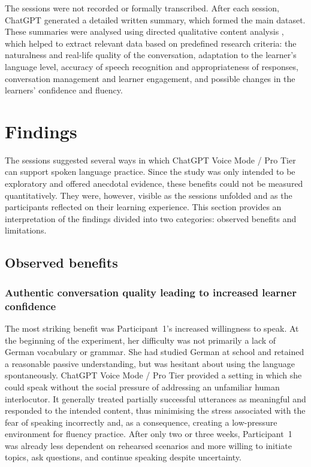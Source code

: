 \documentclass[11pt,a4paper]{article}
\begin{document}
The sessions were not recorded or formally transcribed. After each session, ChatGPT generated a detailed written summary, which formed the main dataset. These summaries were analysed using directed qualitative content analysis \citep{AssarroudiEtAl2018}, which helped to extract relevant data based on predefined research criteria: the naturalness and real-life quality of the conversation, adaptation to the learner's language level, accuracy of speech recognition and appropriateness of responses, conversation management and learner engagement, and possible changes in the learners' confidence and fluency.

\section{Findings}

The sessions suggested several ways in which ChatGPT Voice Mode / Pro Tier can support spoken language practice. Since the study was only intended to be exploratory and offered anecdotal evidence, these benefits could not be measured quantitatively. They were, however, visible as the sessions unfolded and as the participants reflected on their learning experience. This section provides an interpretation of the findings divided into two categories: observed benefits and limitations.

\subsection{Observed benefits}

\subsubsection*{Authentic conversation quality leading to increased learner confidence}

The most striking benefit was Participant~1's increased willingness to speak. At the beginning of the experiment, her difficulty was not primarily a lack of German vocabulary or grammar. She had studied German at school and retained a reasonable passive understanding, but was hesitant about using the language spontaneously. ChatGPT Voice Mode / Pro Tier provided a setting in which she could speak without the social pressure of addressing an unfamiliar human interlocutor. It generally treated partially successful utterances as meaningful and responded to the intended content, thus minimising the stress associated with the fear of speaking incorrectly and, as a consequence, creating a low-pressure environment for fluency practice. After only two or three weeks, Participant~1 was already less dependent on rehearsed scenarios and more willing to initiate topics, ask questions, and continue speaking despite uncertainty.
\end{document}
